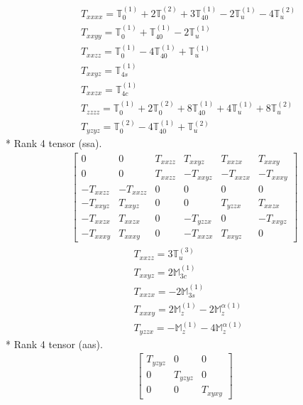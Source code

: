 \documentclass[fleqn,8pt,landscape]{jsarticle}
\begin{document}
\begin{align*}
& T_{xxxx} = \mathbb{T}_{0}^{(1)} + 2 \mathbb{T}_{0}^{(2)} + 3 \mathbb{T}_{40}^{(1)} - 2 \mathbb{T}_{u}^{(1)} - 4 \mathbb{T}_{u}^{(2)} \\
& T_{xxyy} = \mathbb{T}_{0}^{(1)} + \mathbb{T}_{40}^{(1)} - 2 \mathbb{T}_{u}^{(1)} \\
& T_{xxzz} = \mathbb{T}_{0}^{(1)} - 4 \mathbb{T}_{40}^{(1)} + \mathbb{T}_{u}^{(1)} \\
& T_{xxyz} = \mathbb{T}_{4s}^{(1)} \\
& T_{xxzx} = \mathbb{T}_{4c}^{(1)} \\
& T_{zzzz} = \mathbb{T}_{0}^{(1)} + 2 \mathbb{T}_{0}^{(2)} + 8 \mathbb{T}_{40}^{(1)} + 4 \mathbb{T}_{u}^{(1)} + 8 \mathbb{T}_{u}^{(2)} \\
& T_{yzyz} = \mathbb{T}_{0}^{(2)} - 4 \mathbb{T}_{40}^{(1)} + \mathbb{T}_{u}^{(2)}
\end{align*}
* Rank 4 tensor (ssa).
\begin{align*}
\begin{bmatrix} 0 & 0 & T_{xxzz} & T_{xxyz} & T_{xxzx} & T_{xxxy} \\ 0 & 0 & T_{xxzz} & - T_{xxyz} & - T_{xxzx} & - T_{xxxy} \\ - T_{xxzz} & - T_{xxzz} & 0 & 0 & 0 & 0 \\ - T_{xxyz} & T_{xxyz} & 0 & 0 & T_{yzzx} & T_{xxzx} \\ - T_{xxzx} & T_{xxzx} & 0 & - T_{yzzx} & 0 & - T_{xxyz} \\ - T_{xxxy} & T_{xxxy} & 0 & - T_{xxzx} & T_{xxyz} & 0 \end{bmatrix}
\end{align*}
\begin{align*}
& T_{xxzz} = 3 \mathbb{T}_{u}^{(3)} \\
& T_{xxyz} = 2 \mathbb{M}_{3c}^{(1)} \\
& T_{xxzx} = - 2 \mathbb{M}_{3s}^{(1)} \\
& T_{xxxy} = 2 \mathbb{M}_{z}^{(1)} - 2 \mathbb{M}_{z}^{\alpha(1)} \\
& T_{yzzx} = - \mathbb{M}_{z}^{(1)} - 4 \mathbb{M}_{z}^{\alpha(1)}
\end{align*}
* Rank 4 tensor (aas).
\begin{align*}
\begin{bmatrix} T_{yzyz} & 0 & 0 \\ 0 & T_{yzyz} & 0 \\ 0 & 0 & T_{xyxy} \end{bmatrix}
\end{align*}
\end{document}
